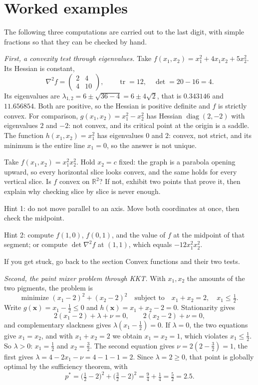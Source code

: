 \section{Worked examples}

The following three computations are carried out to the last digit, with simple fractions so
that they can be checked by hand.

\emph{First, a convexity test through eigenvalues.} Take
$f(x_{1},x_{2})=x_{1}^{2}+4x_{1}x_{2}+5x_{2}^{2}$. Its Hessian is constant,
\[
  \nabla^{2}f=\begin{pmatrix}2&4\\4&10\end{pmatrix},
  \qquad
  \operatorname{tr}=12,\quad \det=20-16=4 .
\]
Its eigenvalues are $\lambda_{1,2}=6\pm\sqrt{36-4}=6\pm4\sqrt{2}$, that is $0.343146$ and
$11.656854$. Both are positive, so the Hessian is positive definite and $f$ is strictly convex.
For comparison, $g(x_{1},x_{2})=x_{1}^{2}-x_{2}^{2}$ has Hessian
$\operatorname{diag}(2,-2)$ with eigenvalues $2$ and $-2$: not convex, and its critical point at
the origin is a saddle. The function $h(x_{1},x_{2})=x_{1}^{2}$ has eigenvalues $0$ and $2$:
convex, not strict, and its minimum is the entire line $x_{1}=0$, so the answer is not unique.

\begin{tantangan}
Take $f(x_{1},x_{2})=x_{1}^{2}x_{2}^{2}$. Hold $x_{2}=c$ fixed: the graph is a parabola opening
upward, so every horizontal slice looks convex, and the same holds for every vertical slice. Is
$f$ convex on $\mathbb{R}^{2}$? If not, exhibit two points that prove it, then explain why
checking slice by slice is never enough.

Hint 1: do not move parallel to an axis. Move both coordinates at once, then check the midpoint.

Hint 2: compute $f(1,0)$, $f(0,1)$, and the value of $f$ at the midpoint of that segment; or
compute $\det\nabla^{2}f$ at $(1,1)$, which equals $-12x_{1}^{2}x_{2}^{2}$.

If you get stuck, go back to the section Convex functions and their two tests.
\end{tantangan}

\emph{Second, the paint mixer problem through KKT.} With $x_{1},x_{2}$ the amounts of the two
pigments, the problem is
\[
  \text{minimize } (x_{1}-2)^{2}+(x_{2}-2)^{2}
  \quad\text{subject to}\quad x_{1}+x_{2}=2,\quad x_{1}\le\tfrac12 .
\]
Write $g(\mathbf{x})=x_{1}-\tfrac12\le0$ and $h(\mathbf{x})=x_{1}+x_{2}-2=0$. Stationarity gives
\[
  2(x_{1}-2)+\lambda+\nu=0,\qquad 2(x_{2}-2)+\nu=0 ,
\]
and complementary slackness gives $\lambda(x_{1}-\tfrac12)=0$. If $\lambda=0$, the two
equations give $x_{1}=x_{2}$, and with $x_{1}+x_{2}=2$ we obtain $x_{1}=x_{2}=1$, which
violates $x_{1}\le\tfrac12$. So $\lambda>0$: $x_{1}=\tfrac12$ and $x_{2}=\tfrac32$. The second
equation gives $\nu=2(2-\tfrac32)=1$, the first gives
$\lambda=4-2x_{1}-\nu=4-1-1=2$. Since $\lambda=2\ge0$, that point is globally optimal by the
sufficiency theorem, with
\[
  p^{*}=\bigl(\tfrac12-2\bigr)^{2}+\bigl(\tfrac32-2\bigr)^{2}
  =\tfrac94+\tfrac14=\tfrac52=2.5 .
\]

